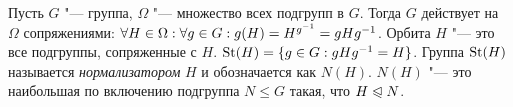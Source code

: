 \begin{example}
	Пусть $G$ "--- группа, $\Omega$ "--- множество всех подгрупп в $G$. Тогда $G$ действует на $\Omega$ сопряжениями: $\forall H \in \Omega: \forall g \in G: g(H) \hm= H^{g^{-1}} \hm= gHg^{-1}$. Орбита $H$ "--- это все подгруппы, сопряженные с $H$. $\St(H) \hm= \{g \in G: gHg^{-1} = H\}$. Группа $\operatorname{St}(H)$ называется \textit{нормализатором} $H$ и обозначается как $N(H)$. $N(H)$ "--- это наибольшая по включению подгруппа $N \le G$ такая, что $H \trianglelefteqslant N$.
\end{example}